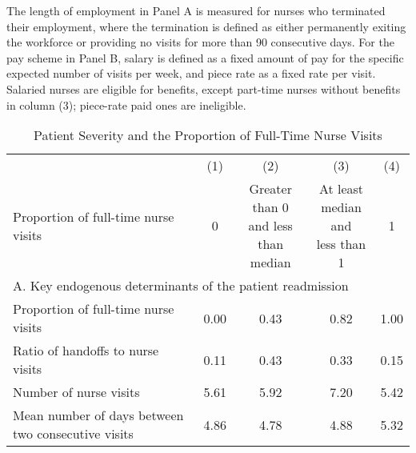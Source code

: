 \documentclass[final,12pt]{article}
\begin{document}
\begin{singlespace}
\begin{table}[H]
\begin{threeparttable}
\begin{tablenotes}
	The length of employment in Panel A is measured for nurses who terminated their employment, where the termination is defined as either permanently exiting the workforce or providing no visits for more than 90 consecutive days.
	For the pay scheme in Panel B, salary is defined as a fixed amount of pay for the specific expected number of visits per week, and piece rate as a fixed rate per visit. Salaried nurses are eligible for benefits, except part-time nurses without benefits in column (3); piece-rate paid ones are ineligible.
	\end{tablenotes}
\end{threeparttable}
\end{table}


\newpage
\begin{table}[H]
\footnotesize
\setlength\tabcolsep{1pt}
\centering
\caption{Patient Severity and the Proportion of Full-Time Nurse Visits}
\label{tab:severity_bylabormix}
\begin{threeparttable}
\def\sym#1{\ifmmode^{#1}\else\(^{#1}\)\fi}
\begin{tabular}{l*{4}c}
\toprule
 & (1) & (2) & (3) & (4) \\
Proportion of full-time nurse visits & 0 & \shortstack{Greater than 0\\and less than\\median} & \shortstack{At least\\median and\\ less than 1}   & 1  \\
\midrule

\multicolumn{5}{l}{A. Key endogenous determinants of the patient readmission}\\
Proportion of full-time nurse visits & 0.00  & 0.43  & 0.82  & 1.00 \\
Ratio of handoffs to nurse visits & 0.11  & 0.43  & 0.33  & 0.15 \\
Number of nurse visits & 5.61  & 5.92  & 7.20  & 5.42 \\
Mean number of days between two consecutive visits & 4.86  & 4.78  & 4.88  & 5.32 \\


\end{tabular}
\end{threeparttable}
\end{table}
\end{singlespace}
\end{document}
